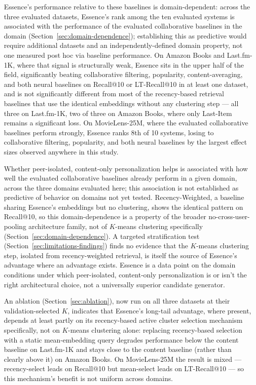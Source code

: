 \documentclass[11pt,a4paper]{article}
\begin{document}
Essence's performance relative to these baselines is domain-dependent:
across the three evaluated datasets, Essence's rank among the ten
evaluated systems is associated with the performance of the
evaluated collaborative baselines in the domain
(Section~\ref{sec:domain-dependence}); establishing this as predictive
would require additional datasets and an independently-defined domain
property, not one measured post hoc via baseline performance. On Amazon Books and Last.fm-1K,
where that signal is structurally weak, Essence sits in the upper half of
the field, significantly beating collaborative filtering, popularity,
content-averaging, and both neural baselines on Recall@10 or LT-Recall@10
in at least one dataset, and is not significantly different from most
of the recency-based retrieval baselines that use the
identical embeddings without any clustering step --- all three on
Last.fm-1K, two of three on Amazon Books, where only Last-Item remains a
significant loss. On MovieLens-25M, where the evaluated collaborative baselines perform strongly, Essence ranks 8th of
10 systems, losing to collaborative filtering, popularity, and both neural
baselines by the largest effect sizes observed anywhere in this study.

Whether peer-isolated, content-only personalization helps is associated
with how well the evaluated collaborative baselines already perform in a
given domain, across the three domains evaluated here; this association is not
established as predictive of behavior on domains not yet tested.
Recency-Weighted, a baseline sharing Essence's embeddings but no
clustering, shows the identical pattern on Recall@10, so this
domain-dependence is a property of the broader no-cross-user-pooling
architecture family, not of $K$-means clustering specifically
(Section~\ref{sec:domain-dependence}). A targeted stratification test
(Section~\ref{sec:limitations-findings}) finds no evidence that the
$K$-means clustering step, isolated from recency-weighted retrieval, is
itself the source of Essence's advantage where an advantage exists.
Essence is a data point on the domain conditions under which
peer-isolated, content-only personalization is or isn't the right
architectural choice, not a universally superior candidate generator.

An ablation (Section~\ref{sec:ablation}), now run on all three datasets at
their validation-selected $K$, indicates that Essence's long-tail
advantage, where present, depends at least partly on its recency-based
active cluster selection mechanism specifically, not on $K$-means
clustering alone: replacing recency-based selection with a static
mean-embedding query degrades performance below the content baseline on
Last.fm-1K and stays close to the content baseline (rather than clearly
above it) on Amazon Books. On MovieLens-25M the result is mixed ---
recency-select leads on Recall@10 but mean-select leads on LT-Recall@10
--- so this mechanism's benefit is not uniform across domains.
\end{document}
